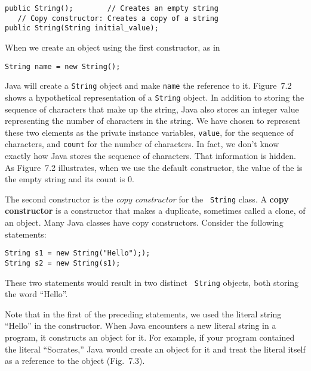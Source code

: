 \begin{jjjlisting}
\begin{lstlisting}
public String();        // Creates an empty string
   // Copy constructor: Creates a copy of a string
public String(String initial_value); 
\end{lstlisting}
\end{jjjlisting}

\noindent When we create an object using the first constructor, as in

\begin{jjjlisting}
\begin{lstlisting}
String name = new String();
\end{lstlisting}
\end{jjjlisting}

\noindent Java will create a {\tt String} object and make {\tt name}
the reference to it.  Figure~7.2 shows a hypothetical representation
of a {\tt String} object. In addition to storing the sequence of
characters that make up the string, Java also stores an integer value
representing the number of characters in the string.  We have chosen
to represent these two elements as the private instance variables,
{\tt value}, for the sequence of characters, and {\tt count} for the
number of characters. In fact, we don't know exactly how Java stores
the sequence of characters. That information is hidden. As Figure~7.2
illustrates, when we use the default constructor, the value of the is
the empty string and its count is 0.


The second constructor is the {\em copy constructor} for the {\tt
String} class.  A {\bf copy constructor} is a constructor that makes a
duplicate, sometimes called a clone, of an object. Many Java classes
have copy constructors.  Consider the following statements:

\begin{jjjlisting}
\begin{lstlisting}
String s1 = new String("Hello"););
String s2 = new String(s1);
\end{lstlisting}
\end{jjjlisting}

\noindent These two statements would result in two distinct {\tt
String} objects, both storing the word ``Hello''.

Note that in the first of the preceding statements, we used the
literal string ``Hello'' in the constructor.  When Java encounters a
new literal string in a program, it constructs an object for it.  For
example, if your program contained the literal ``Socrates,'' Java
would create an object for it and treat the literal itself as a
reference to the object (Fig.~7.3).

